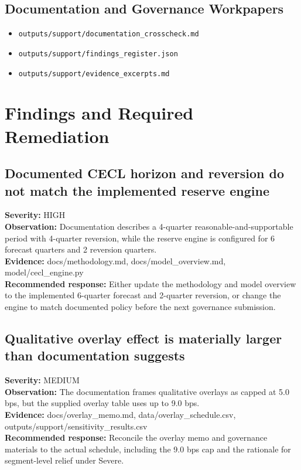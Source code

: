 \documentclass[11pt]{article}
\begin{document}
\subsection*{Documentation and Governance Workpapers}
\begin{itemize}
\item \texttt{outputs/support/documentation\_crosscheck.md}
\item \texttt{outputs/support/findings\_register.json}
\item \texttt{outputs/support/evidence\_excerpts.md}
\end{itemize}
\section*{Findings and Required Remediation}
\subsection*{Documented CECL horizon and reversion do not match the implemented reserve engine}
\textbf{Severity:} HIGH\\
\textbf{Observation:} Documentation describes a 4-quarter reasonable-and-supportable period with 4-quarter reversion, while the reserve engine is configured for 6 forecast quarters and 2 reversion quarters.\\
\textbf{Evidence:} docs/methodology.md, docs/model\_overview.md, model/cecl\_engine.py\\
\textbf{Recommended response:} Either update the methodology and model overview to the implemented 6-quarter forecast and 2-quarter reversion, or change the engine to match documented policy before the next governance submission.
\subsection*{Qualitative overlay effect is materially larger than documentation suggests}
\textbf{Severity:} MEDIUM\\
\textbf{Observation:} The documentation frames qualitative overlays as capped at 5.0 bps, but the supplied overlay table uses up to 9.0 bps.\\
\textbf{Evidence:} docs/overlay\_memo.md, data/overlay\_schedule.csv, outputs/support/sensitivity\_results.csv\\
\textbf{Recommended response:} Reconcile the overlay memo and governance materials to the actual schedule, including the 9.0 bps cap and the rationale for segment-level relief under Severe.
\end{document}
